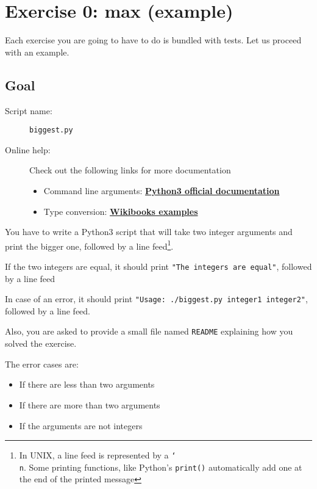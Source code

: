 \documentclass[12pt]{article}
\let\oldhref\href
\renewcommand{\href}[2]{\oldhref{#1}{\bfseries#2}}
\begin{document}
\section{Exercise 0: max (example)}

Each exercise you are going to have to do is bundled with tests.
Let us proceed with an example.

\subsection{Goal}

\begin{description}
        \item[Script name:] \texttt{biggest.py}
        \item[Online help:] Check out the following links for more documentation
\begin{itemize}
	\item Command line arguments: \href{https://docs.python.org/3.0/library/sys.html\#sys.argv}{Python3 official documentation}
	\item Type conversion: \href{https://en.wikibooks.org/wiki/Python_Programming/Data_Types\#Type_conversion}{Wikibooks examples}
\end{itemize}
\end{description}

You have to write a Python3 script that will take two integer arguments and print the bigger one, followed by a line feed\footnote{In UNIX, a line feed is represented by a \texttt{\char`\\
n}. Some printing functions, like Python's \texttt{print()} automatically add one at the end of the printed message}.

If the two integers are equal, it should print \texttt{"The integers are equal"}, followed by a line feed

In case of an error, it should print \texttt{"Usage: ./biggest.py integer1 integer2"}, followed by a line feed.

Also, you are asked to provide a small file named \texttt{README} explaining how you solved the exercise.

The error cases are:

\begin{itemize}
	\item If there are less than two arguments
	\item If there are more than two arguments
	\item If the arguments are not integers
\end{itemize}
\end{document}
